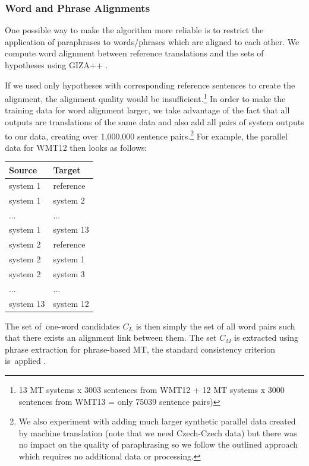 \subsubsection{Word and Phrase Alignments}
\label{alignments}
One possible way to make the algorithm more reliable is to restrict the
application of paraphrases to words/phrases which are aligned to each other. 
We compute word alignment between reference translations and the sets of
hypotheses using GIZA++ \citep{gizapp}.

If we used only hypotheses with corresponding reference sentences to create the 
alignment, the alignment quality would be insufficient.\footnote{13 MT systems x 
3003 sentences from WMT12 + 12 MT systems x 3000 sentences from WMT13
= only 75039 sentence pairs)} In order to make the training data for word 
alignment larger, we take advantage of the fact that all outputs are 
translations of the same data and also add all pairs of system outputs to our 
data, creating over 1,000,000  sentence pairs.\footnote{We 
also experiment with adding much larger synthetic parallel data created by 
machine translation (note that we need Czech-Czech data) but there was no 
impact on the quality of paraphrasing so we follow the outlined approach which 
requires no additional data or processing.} For example, the parallel data for 
WMT12 then looks as follows:

\begin{center}
\begin{tabular}{ll}
Source & Target \\
\hline
system 1 & reference \\
system 1 & system 2 \\
... & ...\\
system 1 & system 13 \\
system 2 & reference \\
system 2 & system 1 \\
system 2 & system 3 \\
... & ... \\
system 13 & system 12 \\
\end{tabular}
\end{center}

The set of~one-word candidates $C_L$ is then simply the set of all word pairs such
that there exists an alignment link between them. The set $C_M$ is extracted
using phrase extraction for phrase-based MT, the standard consistency criterion
is~applied \citep{Och99improvedalignment}.

